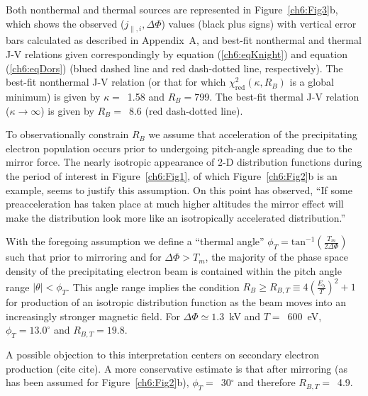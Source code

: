   Both nonthermal and thermal sources are represented in
  Figure~\ref{ch6:Fig3}b, which shows the observed ($j_{\parallel,i},
  \Delta \Phi$) values (black plus signs) with vertical error bars
  calculated as described in Appendix~A, and best-fit nonthermal and
  thermal J-V relations given correspondingly by equation
  (\ref{ch6:eqKnight}) and equation (\ref{ch6:eqDors}) (blued dashed line and
  red dash-dotted line, respectively). The best-fit nonthermal J-V
  relation (or that for which $\chi^2_{\textrm{red}} ( \kappa, R_B )$
  is a global minimum) is given by $\kappa =$~1.58 and $R_B =$799. The
  best-fit thermal J-V relation ($\kappa \rightarrow \infty$) is given
  by $R_B =$~8.6 (red dash-dotted line).


  To observationally constrain $R_B$ we assume that acceleration of
  the precipitating electron population occurs prior to undergoing
  pitch-angle spreading due to the mirror force. The nearly isotropic
  appearance of 2-D distribution functions during the period of
  interest in Figure~\ref{ch6:Fig1}, of which Figure~\ref{ch6:Fig2}b is an
  example, seems to justify this assumption. On this point
  \citet{Bostrom2003a} has observed, ``If some preacceleration has
  taken place at much higher altitudes the mirror effect will make the
  distribution look more like an isotropically accelerated
  distribution.''

  With the foregoing assumption we define a ``thermal angle'' $\phi_T
  = \textrm{tan}^{-1} ( \frac{T_m}{2 \Delta \Phi} )$ such that prior
  to mirroring and for $\Delta \Phi > T_m$, the majority of the phase
  space density of the precipitating electron beam is contained within
  the pitch angle range $ \vert \theta \vert < \phi_T$.  This angle
  range implies the condition $R_B \geq R_{B,T} \equiv 4 (
  \frac{E_b}{T} )^2 + 1$ for production of an isotropic distribution
  function as the beam moves into an increasingly stronger magnetic
  field. For $\Delta \Phi \simeq 1.3$~kV and $T =$~600~eV, $\phi_T =
  13.0^\circ$ and $R_{B,T} = 19.8$.

  A possible objection to this interpretation centers on secondary
  electron production (cite cite). A more conservative estimate is
  that after mirroring (as has been assumed for
  Figure~\ref{ch6:Fig2}b), $\phi_T =$~30$^\circ$ and therefore $R_{B,T}
  =$~4.9.

